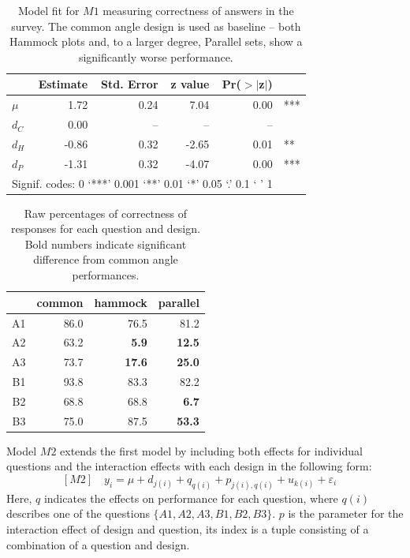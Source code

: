 \begin{table}[ht]
\begin{center}
\begin{tabular}{lrrrrl}
  \hline
 & Estimate & Std. Error & z value & Pr($>$$|$z$|$) & \\ 
  \hline
$\mu$ & 1.72 & 0.24 & 7.04 & 0.00 & ***\\ [5pt]
  $d_C$& 0.00 & -- & -- & -- \\ 
  $d_H$ & -0.86 & 0.32 & -2.65 & 0.01 & ** \\ 
  $d_P$ & -1.31 & 0.32 & -4.07 & 0.00 & ***\\ 
   \hline
\multicolumn{5}{l}{Signif. codes:  0 `***' 0.001 `**' 0.01 `*' 0.05 `.' 0.1 ` ' 1 }
\end{tabular}
\end{center}
\caption{\label{coef1} Model fit for $M1$ measuring correctness of answers in the survey. The common angle design is used as baseline -- both Hammock plots and, to a larger degree, Parallel sets, show a significantly worse performance. }
\end{table}


\begin{table}[ht]
\begin{center}
\begin{tabular}{rrrr}
  \hline
 & common & hammock & parallel \\ 
  \hline
 A1 & 86.0 & 76.5 & 81.2 \\ 
  A2 & 63.2 & {\bf 5.9} & {\bf 12.5} \\ 
  A3 & 73.7 & {\bf 17.6} & {\bf 25.0} \\ 
  B1 & 93.8 & 83.3 & 82.2 \\ 
  B2 & 68.8 & 68.8 & {\bf 6.7} \\ 
  B3 & 75.0 & 87.5 & {\bf 53.3} \\
   \hline
\end{tabular}
\end{center}
\caption{\label{raw} Raw percentages of correctness of responses for each question and design. Bold numbers indicate significant difference from common angle performances. }
\end{table}

Model $M2$ extends the first model by including both  effects for individual questions and the interaction effects with each design in the following form:
\begin{equation}\label{m2}[M2]
\quad y_i = \mu + d_{j(i)}  + q_{q(i)} + p_{j(i),q(i)} + u_{k(i)} + \varepsilon_i \quad
\end{equation}
Here, $q$ indicates the effects on performance for  each question, where $q(i)$ describes one of the questions $\{A1, A2, A3, B1, B2, B3\}$. $p$ is the parameter for the interaction effect of design and question, its index is a tuple consisting of a combination of a question and design. 

